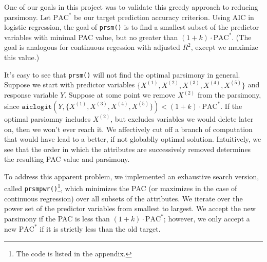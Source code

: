 \documentclass[letter]{article}
\newcounter{foot}
\begin{document}
One of our goals in this project was to validate this greedy approach to reducing parsimony. 
Let $\text{PAC}^*$ be our target prediction accuracy criterion. Using AIC in logistic regression,
the goal of \texttt{prsm()} is to find a smallest subset of the predictor variables with minimal
PAC value, but no greater than $(1+k)\cdot\text{PAC}^*$. (The goal is analogous for continuous regession 
with adjusted $R^2$, except we maximize this value.) 

It's easy to see that \texttt{prsm()} will not find
the optimal parsimony in general. Suppose we start with predictor variables 
$\{X^{(1)}, X^{(2)}, X^{(3)}, X^{(4)}, X^{(5)}\}$ 
and response variable $Y$. Suppose at some point we remove $X^{(2)}$ from the parsimony,
since $\texttt{aiclogit}(Y, \{X^{(1)}, X^{(3)}, X^{(4)}, X^{(5)}\}) < (1+k)\cdot\text{PAC}^*$.  
If the optimal parsiomny includes $X^{(2)}$, but excludes variables we would delete later on, 
then we won't ever reach it. We affectively cut off a branch of computation that would have 
lead to a better, if not globablly optimal solution. Intuitively, we see that the order in 
which the attributes are successively removed determines the resulting PAC value and 
parsimony.

To address this apparent problem, we implemented an exhaustive search version, called 
\texttt{prsmpwr()}\footnote{The code is listed in the appendix.}, which minimizes the 
PAC (or maximizes in the case of continuous 
regression) over all subsets of the attributes. We iterate over the power set of the 
predictor variables from smallest to largest. We accept the new parsimony if the PAC
is less than $(1+k)\cdot\text{PAC}^*$; however, we only accept a new $\text{PAC}^*$  
if it is strictly less than the old target.
\end{document}
